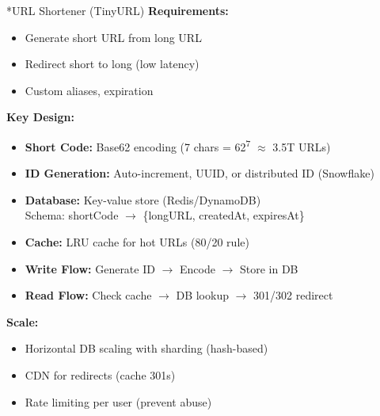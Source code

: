 \documentclass[8pt,landscape]{extarticle}
\makeatletter
\renewcommand{\subsection}{\@startsection{subsection}{2}{0pt}{3pt}{1pt}{\normalfont\normalsize\bfseries}}
\makeatother
\begin{document}
\begin{multicols*}{3}
\subsection*{URL Shortener (TinyURL)}
\textbf{Requirements:}
\begin{itemize}
\item Generate short URL from long URL
\item Redirect short to long (low latency)
\item Custom aliases, expiration
\end{itemize}
\textbf{Key Design:}
\begin{itemize}
\item \textbf{Short Code:} Base62 encoding (7 chars = 62\textsuperscript{7} $\approx$ 3.5T URLs)
\item \textbf{ID Generation:} Auto-increment, UUID, or distributed ID (Snowflake)
\item \textbf{Database:} Key-value store (Redis/DynamoDB)
  \\ Schema: shortCode $\rightarrow$ \{longURL, createdAt, expiresAt\}
\item \textbf{Cache:} LRU cache for hot URLs (80/20 rule)
\item \textbf{Write Flow:} Generate ID $\rightarrow$ Encode $\rightarrow$ Store in DB
\item \textbf{Read Flow:} Check cache $\rightarrow$ DB lookup $\rightarrow$ 301/302 redirect
\end{itemize}
\textbf{Scale:}
\begin{itemize}
\item Horizontal DB scaling with sharding (hash-based)
\item CDN for redirects (cache 301s)
\item Rate limiting per user (prevent abuse)
\end{itemize}


\end{multicols*}
\end{document}
